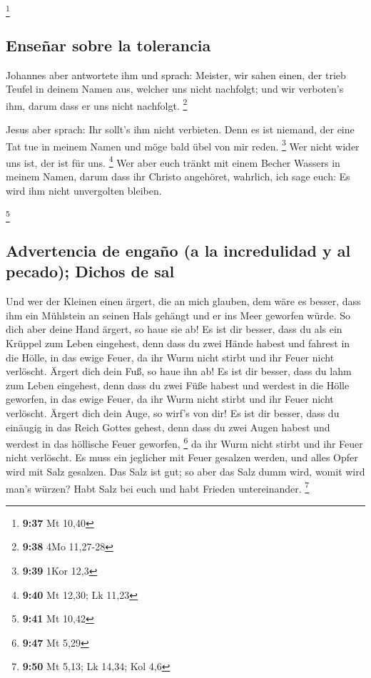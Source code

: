 \footnote{\textbf{9:37} Mt 10,40}

\hypertarget{enseuxf1ar-sobre-la-tolerancia}{%
\subsection{Enseñar sobre la
tolerancia}\label{enseuxf1ar-sobre-la-tolerancia}}

 Johannes aber antwortete ihm und sprach: Meister, wir
sahen einen, der trieb Teufel in deinem Namen aus, welcher uns nicht
nachfolgt; und wir verboten's ihm, darum dass er uns nicht nachfolgt.
\footnote{\textbf{9:38} 4Mo 11,27-28}

 Jesus aber sprach: Ihr sollt's ihm nicht verbieten. Denn
es ist niemand, der eine Tat tue in meinem Namen und möge bald übel von
mir reden. \footnote{\textbf{9:39} 1Kor 12,3}  Wer nicht
wider uns ist, der ist für uns. \footnote{\textbf{9:40} Mt 12,30; Lk
  11,23}  Wer aber euch tränkt mit einem Becher Wassers
in meinem Namen, darum dass ihr Christo angehöret, wahrlich, ich sage
euch: Es wird ihm nicht unvergolten bleiben.

\footnote{\textbf{9:41} Mt 10,42}

\hypertarget{advertencia-de-engauxf1o-a-la-incredulidad-y-al-pecado-dichos-de-sal}{%
\subsection{Advertencia de engaño (a la incredulidad y al pecado);
Dichos de
sal}\label{advertencia-de-engauxf1o-a-la-incredulidad-y-al-pecado-dichos-de-sal}}

 Und wer der Kleinen einen ärgert, die an mich glauben,
dem wäre es besser, dass ihm ein Mühlstein an seinen Hals gehängt und er
ins Meer geworfen würde.  So dich aber deine Hand ärgert,
so haue sie ab! Es ist dir besser, dass du als ein Krüppel zum Leben
eingehest, denn dass du zwei Hände habest und fahrest in die Hölle, in
das ewige Feuer,  da ihr Wurm nicht stirbt und ihr Feuer
nicht verlöscht.  Ärgert dich dein Fuß, so haue ihn ab!
Es ist dir besser, dass du lahm zum Leben eingehest, denn dass du zwei
Füße habest und werdest in die Hölle geworfen, in das ewige Feuer,
 da ihr Wurm nicht stirbt und ihr Feuer nicht verlöscht.
 Ärgert dich dein Auge, so wirf's von dir! Es ist dir
besser, dass du einäugig in das Reich Gottes gehest, denn dass du zwei
Augen habest und werdest in das höllische Feuer geworfen, \footnote{\textbf{9:47}
  Mt 5,29}  da ihr Wurm nicht stirbt und ihr Feuer nicht
verlöscht.  Es muss ein jeglicher mit Feuer gesalzen
werden, und alles Opfer wird mit Salz gesalzen.  Das Salz
ist gut; so aber das Salz dumm wird, womit wird man's würzen? Habt Salz
bei euch und habt Frieden untereinander. \footnote{\textbf{9:50} Mt
  5,13; Lk 14,34; Kol 4,6}

